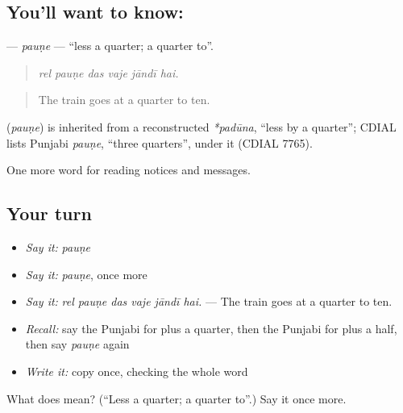 \subsection*{You'll want to know: }
\textbf{} — \emph{pauṇe} — \textquotedblleft{}less a quarter; a quarter to\textquotedblright{}.

\begin{quote}
     
\end{quote}

\begin{quote}
\emph{rel pauṇe das vaje jāndī hai.}
\end{quote}

\begin{quote}
The train goes at a quarter to ten.
\end{quote}

\begin{cousinweb}
\textbf{} (\emph{pauṇe}) is inherited from a reconstructed \emph{*padūna}, \textquotedblleft{}less by a quarter\textquotedblright{}; CDIAL lists Punjabi \emph{pauṇe}, \textquotedblleft{}three quarters\textquotedblright{}, under it (CDIAL 7765).
\end{cousinweb}

\begin{grammarlens}[title={What you've built}]
One more word for reading notices and messages.
\end{grammarlens}

\subsection*{Your turn}
\begin{itemize}
\raggedright
  \item \emph{Say it:} \emph{pauṇe}
  \item \emph{Say it:} \emph{pauṇe}, once more
  \item \emph{Say it:} \emph{rel pauṇe das vaje jāndī hai.} — The train goes at a quarter to ten.
  \item \emph{Recall:} say the Punjabi for plus a quarter, then the Punjabi for plus a half, then say \emph{pauṇe} again
  \item \emph{Write it:} copy \textbf{} once, checking the whole word
\end{itemize}

\begin{tcolorbox}[breakable,colback=teal!4,colframe=teal!35!black,title={Before you move on}]
What does  mean? (\textquotedblleft{}Less a quarter; a quarter to\textquotedblright{}.) Say it once more.
\end{tcolorbox}
